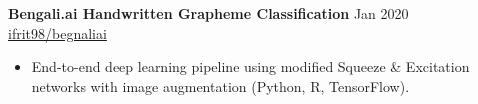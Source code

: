 \documentclass[10.5pt]{res}
\begin{document}
\begin{resume}
{\bf Bengali.ai Handwritten Grapheme Classification} \hfill Jan 2020\\
\href{https://github.com/ifrit98/begnaliai}{ifrit98/begnaliai} \\
\begin{itemize}\rightmargin=0cm \itemsep 2pt
    \item End-to-end deep learning pipeline using modified Squeeze \& Excitation networks with image augmentation (Python, R, TensorFlow).
\end{itemize}

\end{resume} 
\end{document}
